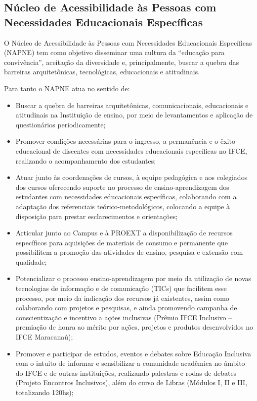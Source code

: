 \documentclass{paper}
\begin{document}
\subsection{Núcleo de Acessibilidade às Pessoas com Necessidades Educacionais Específicas} 

O Núcleo de Acessibilidade às Pessoas com Necessidades Educacionais Específicas (NAPNE) tem como objetivo disseminar uma cultura da “educação para convivência”, aceitação da diversidade e, principalmente, buscar a quebra das barreiras arquitetônicas, tecnológicas, educacionais e atitudinais.

Para tanto o NAPNE atua no sentido de:

\begin{itemize}
\item Buscar a quebra de barreiras arquitetônicas, comunicacionais, educacionais e atitudinais na Instituição de ensino, por meio de levantamentos e aplicação de questionários periodicamente;
\item Promover condições necessárias para o ingresso, a permanência e o êxito educacional de discentes com necessidades educacionais específicas no IFCE, realizando o acompanhamento dos estudantes;
\item Atuar junto às coordenações de cursos, à equipe pedagógica e aos colegiados dos cursos oferecendo suporte no processo de ensino-aprendizagem dos estudantes com necessidades educacionais específicas, colaborando com a adaptação dos referenciais teórico-metodológicos, colocando a equipe à disposição para prestar esclarecimentos e orientações;
\item Articular junto ao Campus e à PROEXT a disponibilização de recursos específicos para aquisições de materiais de consumo e permanente que possibilitem a promoção das atividades de ensino, pesquisa e extensão com qualidade;
\item Potencializar o processo ensino-aprendizagem por meio da utilização de novas tecnologias de informação e de comunicação (TICs) que facilitem esse processo, por meio da indicação dos recursos já existentes, assim como colaborando com projetos e pesquisas, e ainda promovendo campanha de conscientização e incentivo a ações inclusivas (Prêmio IFCE Inclusivo – premiação de honra ao mérito por ações, projetos e produtos desenvolvidos no IFCE Maracanaú);
\item Promover e participar de estudos, eventos e debates sobre Educação Inclusiva com o intuito de informar e sensibilizar a comunidade acadêmica no âmbito do IFCE e de outras instituições, realizando palestras e rodas de debates (Projeto Encontros Inclusivos), além do curso de Libras (Módulos I, II e III, totalizando 120hs);

\end{itemize}
\end{document}
